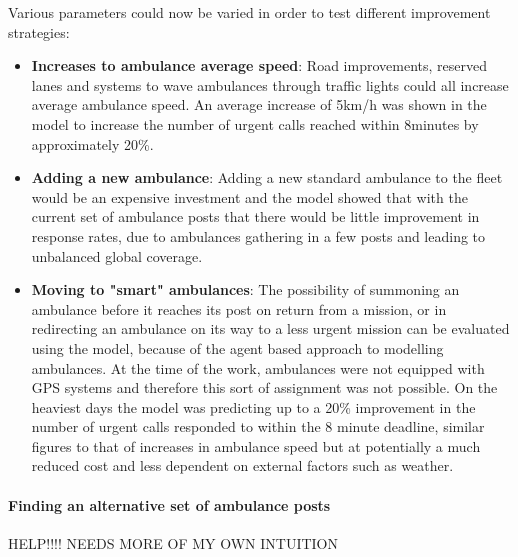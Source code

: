 \documentclass[11pt]{article} %
\begin{document}
Various parameters could now be varied in order to test different improvement strategies:
\begin{itemize}
	\item \textbf{Increases to  ambulance average speed}: Road improvements, reserved lanes and systems to wave ambulances through traffic lights could all increase average ambulance speed. An average increase of 5km/h was shown in the model to increase the number of urgent calls reached within 8minutes by approximately 20\%.
	\item \textbf{Adding a new ambulance}:  Adding a new standard ambulance to the fleet would be an expensive investment and the model showed that with the current set of ambulance posts that there would be little improvement in response rates, due to ambulances gathering in a few posts and leading to unbalanced global coverage. 
	\item \textbf{Moving to "smart" ambulances}: The possibility of summoning an ambulance before it reaches its post on return from a mission, or in redirecting an ambulance on its way to a less urgent mission can be evaluated using the model, because of the agent based approach to modelling ambulances. At the time of the work, ambulances were not equipped with GPS systems and therefore this sort of assignment was not possible. On the heaviest days the model was predicting up to a 20\% improvement in the number of urgent calls responded to within the 8 minute deadline, similar figures to that of increases in ambulance speed but at potentially a much reduced cost and less dependent on external factors such as weather. 
\end{itemize}

\paragraph{Finding an alternative set of ambulance posts}
HELP!!!! NEEDS MORE OF MY OWN INTUITION 
\end{document}
